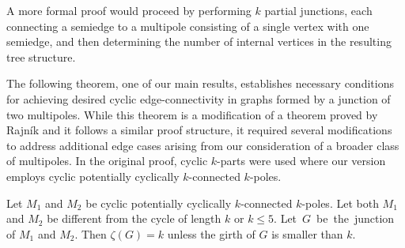 \documentclass[12pt, twoside]{book}
\begin{document}
A more formal proof would proceed by performing $k$ partial junctions, each connecting a semiedge to a multipole consisting of a single vertex with one semiedge, and then determining the number of internal vertices in the resulting tree structure.

The following theorem, one of our main results, establishes necessary conditions for achieving desired cyclic edge-connectivity in graphs formed by a junction of two multipoles. While this theorem is a modification of a theorem proved by Rajník \cite[Theorem 5.2]{Rajnik_phd} and it follows a similar proof structure, it required several modifications to address additional edge cases arising from our consideration of a broader class of multipoles. In the original proof, cyclic $k$-parts were used where our version employs cyclic potentially cyclically $k$-connected $k$-poles.

\begin{theorem}\label{th:junction-of-kpoles-cyclic-edge-connectivity}
	Let $M_1$ and $M_2$ be cyclic potentially cyclically $k$-connected $k$-poles. Let both $M_1$ and $M_2$ be different from the cycle of length $k$ or $k\leq 5$. \mbox{Let $G$ be the junction} of $M_1$ and $M_2$. Then $\zeta(G)=k$ unless the girth of $G$ is smaller than $k$.
\end{theorem}
\end{document}
